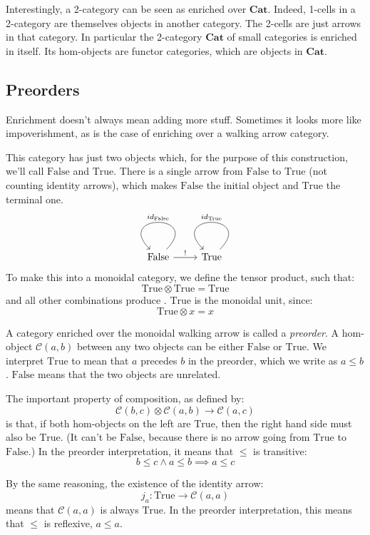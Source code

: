 \documentclass[DaoFP]{subfiles}
\begin{document}
Interestingly, a 2-category can be seen as enriched over $\mathbf{Cat}$. Indeed, 1-cells in a 2-category are themselves objects in another category. The 2-cells are just arrows in that category. In particular the 2-category $\mathbf{Cat}$ of small categories is enriched in itself. Its hom-objects are functor categories, which are objects in $\mathbf{Cat}$.

\subsection{Preorders}

Enrichment doesn't always mean adding more stuff. Sometimes it looks more like impoverishment, as is the case of enriching over a walking arrow category. 

This category has just two objects which, for the purpose of this construction, we'll call $\text{False}$ and $\text{True}$. There is a single arrow from $\text{False}$ to $\text{True}$ (not counting identity arrows), which makes $\text{False}$ the initial object and $\text{True}$ the terminal one. 
\[
 \begin{tikzcd}
 \text{False}
 \arrow[r, "!"]
 \arrow[loop, "id_{\text{False}}"']
 & \text{True}
 \arrow[loop, "id_{\text{True}}"']
 \end{tikzcd}
\]
To make this into a monoidal category, we define the tensor product, such that:
\[ \text{True} \otimes \text{True} = \text{True} \]
and all other combinations produce .
$\text{True}$ is the monoidal unit, since:
\[ \text{True} \otimes x = x \]

A category enriched over the monoidal walking arrow is called a \emph{preorder}. A hom-object $\mathcal C (a, b)$ between any two objects can be either $\text{False}$ or $\text{True}$. We interpret $\text{True}$ to mean that $a$ precedes $b$ in the preorder, which we write as $a \le b$. $\text{False}$ means that the two objects are unrelated. 

The important property of composition, as defined by:
\[ \mathcal C (b, c) \otimes \mathcal C (a, b) \to \mathcal C (a, c) \]
is that, if both hom-objects on the left are $\text{True}$, then the right hand side must also be $\text{True}$. (It can't be $\text{False}$, because there is no arrow going from $\text{True}$ to $\text{False}$.) In the preorder interpretation, it means that $\le$ is transitive:
\[ b \le c \land a \le b \implies a \le c \]

By the same reasoning, the existence of the identity arrow:
\[ j_a \colon \text{True} \to \mathcal C(a, a) \]
means that $\mathcal C(a, a)$ is always $\text{True}$. In the preorder interpretation, this means that $\le$ is reflexive, $a \le a$.
\end{document}
